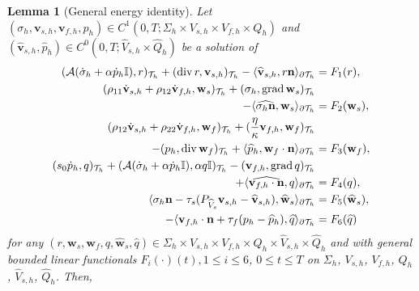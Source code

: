 \documentclass[10pt,letterpaper]{amsart}
\theoremstyle{plain} %
\newtheorem{lemma}[theorem]{Lemma} %
\theoremstyle{remark} %
\newcommand{\vect}[1]{\mathbf{#1}}
\newcommand{\divergence}{\mathrm{div}\,}
\newcommand{\grad}{\mathrm{grad}\,}
\newcommand{\Id}{\mathbb{I}} %
\newcommand{\Ael}{\mathcal{A}} %
\newcommand{\Thprod}[2]{( #1, #2 )_{\mathcal{T}_h}}
\newcommand{\pThprod}[2]{\langle #1, #2 \rangle_{\partial \mathcal{T}_{h}}}
\begin{document}
\begin{lemma}[General energy identity]\label{lemma:energy}
	Let  $(\sigma_{h}, \vect{v}_{s,h}, \vect{v}_{f,h}, p_{h}) \in C^1(0,T; \Sigma_{h} \times V_{s,h} \times V_{f,h} \times Q_{h} )$ and  $(\widehat{\vect{v}}_{s,h}, \widehat{p}_{h}) \in C^0(0,T;  \widehat{V}_{s,h}\times \widehat{Q}_{h})$ be a solution of  
	\begin{subequations}
		\label{eq:general-semidiscrete-eqs}
		\begin{align}
			\label{eq:general-semidiscrete-eq1}
			\Thprod{\Ael(\dot{\sigma}_{h} + \alpha \dot{p}_{h} \Id)}{r} +\Thprod{\divergence r}{\vect{v}_{s,h}} -\pThprod{\widehat{\vect{v}}_{s,h}}{r \vect{n}} &= F_1(r) ,
			\\ 
			\label{eq:general-semidiscrete-eq2}
			\Thprod{\rho_{11}\dot{\vect{v}}_{s,h} + \rho_{12}\dot{\vect{v}}_{f,h}}{\vect{w}_{s}} + \Thprod{\sigma_{h}}{\grad \vect{w}_{s}}&
            \\
            \notag 
            - \pThprod{\widehat{\sigma_{h} \vect{n}}}{\vect{w}_{s}} & = F_2(\vect{w}_{s}), 
			\\
			\label{eq:general-semidiscrete-eq3}
			\Thprod{\rho_{12}\dot{\vect{v}}_{s,h} + \rho_{22}\dot{\vect{v}}_{f,h}}{\vect{w}_{f}} + \Thprod{\frac{\eta}{\kappa} \vect{v}_{f,h}}{\vect{w}_{f}} &
            \\
            \notag 
            - \Thprod{p_{h} }{\divergence\vect{w}_{f}} +\pThprod{\widehat{p}_{h}}{\vect{w}_{f}\cdot\vect{n}} & = F_3(\vect{w}_f), 
			\\
			\label{eq:general-semidiscrete-eq4}
			\Thprod{s_{0}\dot{p}_{h}}{q} + \Thprod{\Ael(\dot{\sigma}_{h}+\alpha \dot{p}_{h}\Id)}{\alpha q\Id} - \Thprod{\vect{v}_{f,h}}{\grad q} &
            \\
            \notag 
            + \pThprod{\widehat{\vect{v}_{f,h}\cdot \vect{n}}}{q} & = F_4(q),
			\\
			\label{eq:general-semidiscrete-eq5}
			\pThprod{\sigma_h \vect{n} - \tau_{s} ({P_{\widehat{V}_s}} \vect{v}_{s,h} - \widehat{\vect{v}}_{s,h}) }{\widehat{\vect{w}}_s} & = F_5(\widehat{\vect{w}}_s),
			\\
			\label{eq:general-semidiscrete-eq6}
			{-}    \pThprod{\vect{v}_{f,h}\cdot\vect{n} + \tau_{f} (p_{h} - \widehat{p}_{h})}{\widehat{q}} & = F_6(\widehat{q})
		\end{align}
	\end{subequations}
	for any $(r, \vect{w}_s, \vect{w}_f, q, \widehat{\vect{w}}_s, \widehat{q}) \in \Sigma_{h} \times V_{s,h} \times V_{f,h} \times Q_{h} \times \widehat{V}_{s,h}\times \widehat{Q}_{h}$ and  with general bounded linear functionals $F_i(\cdot)(t), 1 \le i \le 6$, $0\le t \le T$ on $\Sigma_h$, $V_{s,h}$, $V_{f,h}$, $Q_h$, $\widehat{V}_{s,h}$, $\widehat{Q}_h$. Then, 

\end{lemma}
\end{document}
